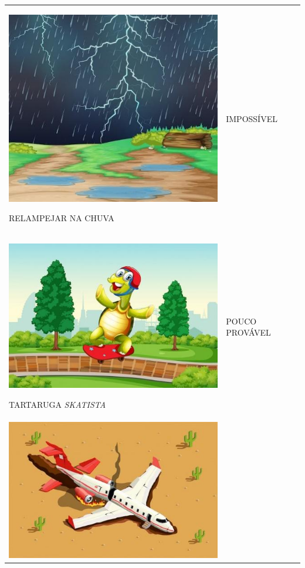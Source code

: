 \begin{longtable}[]{@{}ll@{}}
\begin{minipage}[t]{0.48\columnwidth}\raggedright\strut
\includegraphics[width=.5\textwidth]{media/image82.jpg}

RELAMPEJAR NA CHUVA\strut
\end{minipage} & \begin{minipage}[t]{0.48\columnwidth}\raggedright\strut
IMPOSSÍVEL\strut
\end{minipage}\tabularnewline
\begin{minipage}[t]{0.48\columnwidth}\raggedright\strut
\includegraphics[width=.5\textwidth]{media/image83.jpg}

TARTARUGA \textit{SKATISTA}\strut
\end{minipage} & \begin{minipage}[t]{0.48\columnwidth}\raggedright\strut
POUCO PROVÁVEL\strut
\end{minipage}\tabularnewline
\begin{minipage}[t]{0.48\columnwidth}\raggedright\strut
\includegraphics[width=.5\textwidth]{media/image84.jpg}


\end{minipage}
\end{longtable}
